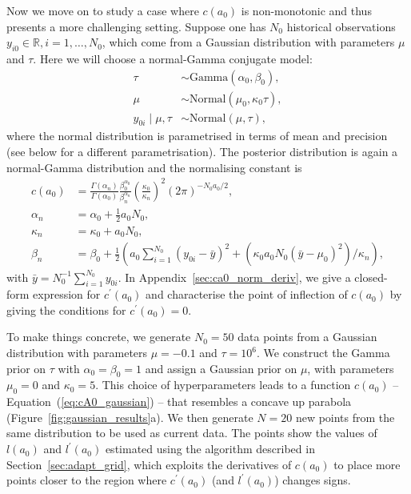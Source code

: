 \documentclass[a4paper, notitlepage, 11pt]{article}
\begin{document}
Now we move on to study a case where $c(a_0)$ is non-monotonic and thus presents a more challenging setting.
Suppose one has $N_0$ historical observations $y_{i0} \in \mathbb{R}, i = 1, \ldots, N_0$, which come from a Gaussian distribution with parameters $\mu$ and $\tau$.
Here we will choose a normal-Gamma conjugate model:
\begin{align*}
 \tau &\sim \text{Gamma}(\alpha_0, \beta_0),\\
 \mu &\sim \text{Normal}(\mu_0, \kappa_0\tau ),\\
 y_{0i} \mid \mu, \tau &\sim \text{Normal}(\mu, \tau),
\end{align*}
where the normal distribution is parametrised in terms of mean and precision (see below for a different parametrisation).
The posterior distribution is again a normal-Gamma distribution and the normalising constant is
\begin{align}
 \label{eq:cA0_gaussian}
 c(a_0) &= \frac{\Gamma(\alpha_n)}{\Gamma(\alpha_0)}\frac{\beta_0^{\alpha_0}}{\beta_n^{\alpha_n}} \left(\frac{\kappa_0}{\kappa_n} \right)^2 (2\pi)^{-N_0 a_0/2},\\
 \nonumber
 \alpha_n &= \alpha_0 + \frac{1}{2}a_0N_0, \\
 \nonumber
 \kappa_n &= \kappa_0 + a_0N_0, \\
 \nonumber
 \beta_n  &= \beta_0 + \frac{1}{2}\left( a_0\sum_{i=1}^{N_0}(y_{0i}-\bar{y})^2 + \left(\kappa_0 a_0 N_0 (\bar{y}-\mu_0)^2\right)/\kappa_n \right),
\end{align}
with $\bar{y} = N_0^{-1}\sum_{i=1}^{N_0} y_{0i}$.
In Appendix~\ref{sec:ca0_norm_deriv}, we give a closed-form expression for $c^\prime(a_0)$ and characterise the point of inflection of $c(a_0)$ by giving the conditions for $c^\prime(a_0) = 0$.

To make things concrete, we generate $N_0 = 50$ data points from a Gaussian distribution with parameters $\mu = -0.1$ and  $\tau = 10^{6}$.
We construct the Gamma prior on $\tau$ with $\alpha_0 = \beta_0 = 1$ and assign a Gaussian prior on $\mu$, with parameters $\mu_0 = 0$ and $\kappa_0 = 5$.
This
choice of hyperparameters leads to a function $c(a_0)$ -- Equation~(\ref{eq:cA0_gaussian}) -- that resembles a concave up parabola (Figure~\ref{fig:gaussian_results}a). 
We then generate $N = 20$ new points from the same distribution to be used as current data.
The points show the values of $l(a_0)$ and $l^\prime(a_0)$ estimated using the algorithm described in Section~\ref{sec:adapt_grid}, which exploits the derivatives of $c(a_0)$ to place more points closer to the region where $c^\prime(a_0)$ (and $l^\prime(a_0)$) changes signs.
\end{document}
